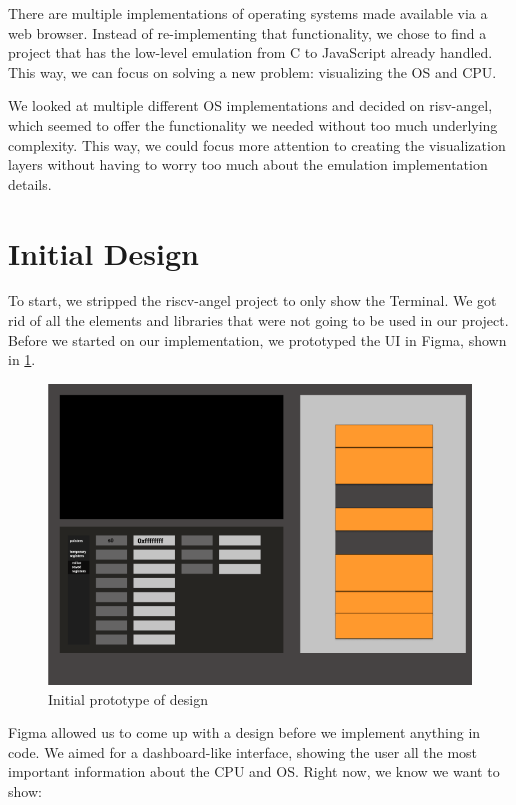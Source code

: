 There are multiple implementations of operating systems made available via a web
browser. Instead of re-implementing that functionality, we chose to find a project that
has the low-level emulation from C to JavaScript already handled. This way, we can
focus on solving a new problem: visualizing the OS and CPU.

We looked at multiple different OS implementations and decided on risv-angel,
which seemed to offer the
functionality we needed without too much underlying complexity. This way, we could
focus more attention to creating the visualization layers without having to worry
too much about the emulation implementation details.

\section{Initial Design}

To start, we stripped the riscv-angel project to only show the Terminal.
We got rid of all the elements and libraries that were not going to be used in our project.
Before we started on our implementation, we prototyped the UI in Figma, shown in \ref{fig:proto1}.

\begin{figure}[H]
  \includegraphics[scale=0.3]{prototype1}
  \caption{Initial prototype of design}
  \label{fig:proto1}
  \centering
\end{figure}

Figma allowed us to come up with a design before we implement anything in code.
We aimed for a dashboard-like interface, showing the user all the most important
information about the CPU and OS.
Right now, we know we want to show:

